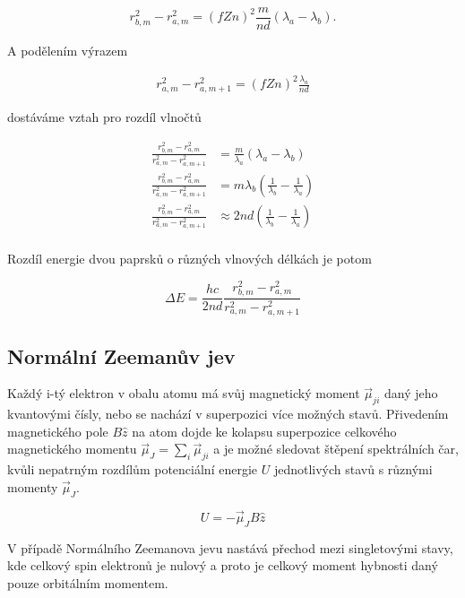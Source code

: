 \documentclass[a4paper,11pt]{article}
\begin{document}
\begin{equation}
r^2_{b,m} - r^2_{a,m} = (f Z n)^2 \frac{m}{ n d} \left( \lambda_a - \lambda_b    \right).
\end{equation}

\noindent
A podělením výrazem

\begin{align*}
    r^2_{a,m}  - r^2_{a,m+1} = (fZn)^2 \frac{\lambda_a}{nd} 
\end{align*}

\noindent
dostáváme vztah pro rozdíl vlnočtů 

\begin{align*}
    \frac{ r^2_{b,m} - r^2_{a,m} }{ r^2_{a,m}  - r^2_{a,m+1} } &= \frac{m}{ \lambda_a} \left( \lambda_a - \lambda_b    \right) \\
    \frac{ r^2_{b,m} - r^2_{a,m} }{ r^2_{a,m}  - r^2_{a,m+1} } &= m \lambda_b \left( \frac{1}{\lambda_b} - \frac{1}{\lambda_a}     \right) \\
    \frac{ r^2_{b,m} - r^2_{a,m} }{ r^2_{a,m}  - r^2_{a,m+1} } & \approx 2 n d  \left( \frac{1}{\lambda_b} - \frac{1}{\lambda_a}     \right) \\
\end{align*}

\noindent
Rozdíl energie dvou paprsků o různých vlnových délkách je potom

\begin{equation}
\Delta E = \frac{hc}{2nd} \frac{ r^2_{b,m} - r^2_{a,m} }{ r^2_{a,m}  - r^2_{a,m+1} } 
\end{equation}

\subsection{Normální Zeemanův jev}

Každý i-tý elektron v obalu atomu má svůj magnetický moment $ \vec{\mu}_{ji} $ daný jeho kvantovými čísly, nebo se nachází v superpozici více možných stavů. Přivedením magnetického pole $ B \hat{z} $ na atom dojde ke kolapsu superpozice celkového magnetického momentu $ \vec{\mu}_J = \sum_i  \vec{\mu}_{ji} $ a je možné sledovat štěpení spektrálních čar, kvůli nepatrným rozdílům potenciální energie $ U $ jednotlivých stavů s různými momenty $ \vec{\mu}_J $.

\begin{equation}
U = - \vec{\mu}_J B \hat{z}
\end{equation}

V případě Normálního Zeemanova jevu nastává přechod mezi singletovými stavy, kde celkový spin elektronů je nulový a proto je celkový moment hybnosti daný pouze orbitálním momentem.
\end{document}
